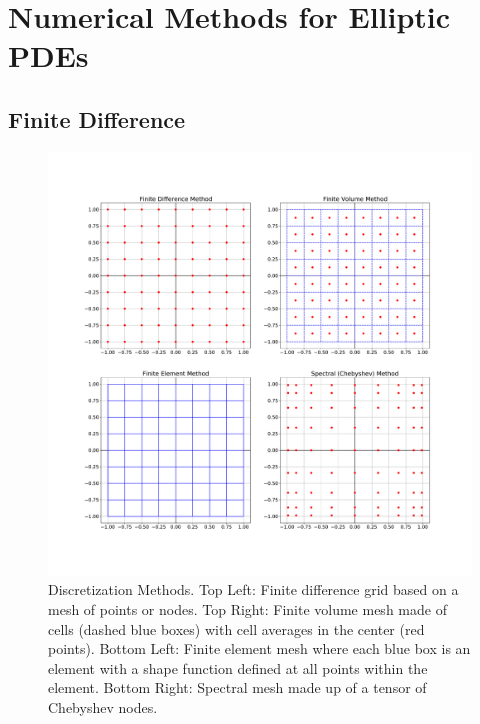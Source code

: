 \section{Numerical Methods for Elliptic PDEs}
\label{sec:numerical-methods-for-elliptic-pdes}

\subsection{Finite Difference}

\begin{figure}
    \centering
    \includegraphics[width=0.8\columnwidth]{figures/PDE_discretization_methods.pdf}
    \caption{Discretization Methods. Top Left: Finite difference grid based on a mesh of points or nodes. Top Right: Finite volume mesh made of cells (dashed blue boxes) with cell averages in the center (red points). Bottom Left: Finite element mesh where each blue box is an element with a shape function defined at all points within the element. Bottom Right: Spectral mesh made up of a tensor of Chebyshev nodes.}
    \label{fig:discretization_methods}
\end{figure}

